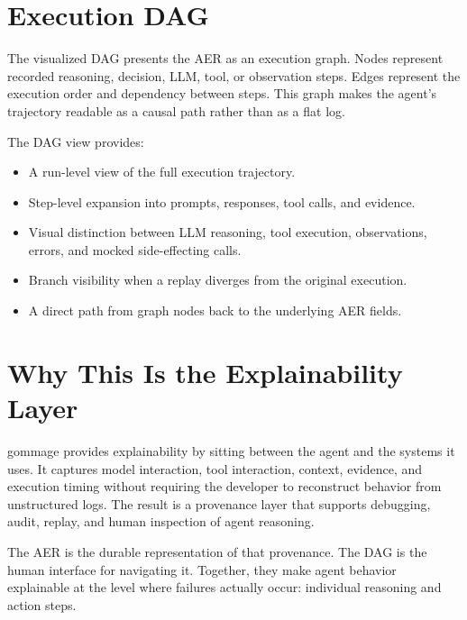 \documentclass[11pt,a4paper]{article}
\begin{document}
\section{Execution DAG}

The visualized DAG presents the AER as an execution graph. Nodes represent
recorded reasoning, decision, LLM, tool, or observation steps. Edges represent
the execution order and dependency between steps. This graph makes the agent's
trajectory readable as a causal path rather than as a flat log.

The DAG view provides:

\begin{itemize}[leftmargin=1.5em]
  \item A run-level view of the full execution trajectory.
  \item Step-level expansion into prompts, responses, tool calls, and evidence.
  \item Visual distinction between LLM reasoning, tool execution, observations,
  errors, and mocked side-effecting calls.
  \item Branch visibility when a replay diverges from the original execution.
  \item A direct path from graph nodes back to the underlying AER fields.
\end{itemize}

\section{Why This Is the Explainability Layer}

gommage provides explainability by sitting between the agent and the systems it
uses. It captures model interaction, tool interaction, context, evidence, and
execution timing without requiring the developer to reconstruct behavior from
unstructured logs. The result is a provenance layer that supports debugging,
audit, replay, and human inspection of agent reasoning.

The AER is the durable representation of that provenance. The DAG is the human
interface for navigating it. Together, they make agent behavior explainable at
the level where failures actually occur: individual reasoning and action steps.
\end{document}
